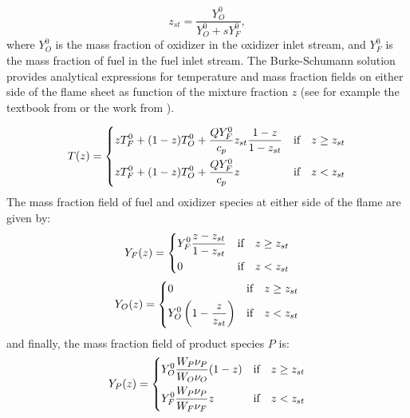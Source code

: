 \begin{equation}
z_{st} = \frac{Y_O^0}{Y_O^0+sY_F^0},
\end{equation}
where $Y_O^0$ is the mass fraction of oxidizer in the oxidizer inlet stream, and $Y_F^0$ is the mass fraction of fuel in the fuel inlet stream. 
The Burke-Schumann solution provides analytical expressions for temperature and mass fraction fields on either side of the flame sheet as function of the mixture fraction $z$ (see for example the textbook from \cite{poinsotTheoreticalNumericalCombustion2005} or the work from \cite{keyesFlameSheetStarting1987}).





\begin{equation}\label{eq:BS-T}
T(z) =
\begin{dcases}
z T_F^0 + (1-z)T_O^0 + \frac{Q Y_F^0}{c_p}z_{st}\frac{1 - z}{1-z_{st}} & \text{if}\quad z \geq z_{st}\\
z T_F^0 + (1-z)T_O^0 + \frac{Q Y_F^0}{c_p}z & \text{if}\quad z < z_{st}
\end{dcases}
\end{equation}
The mass fraction field of fuel and oxidizer species at either side of the flame are given by:
\begin{equation}\label{eq:BS-YF}
Y_F(z) =
\begin{dcases}
Y_F^0\frac{z - z_{st}}{1-z_{st}} & \text{if}\quad z \geq z_{st}\\
0 & \text{if} \quad z < z_{st}
\end{dcases}
\end{equation}
\begin{equation}\label{eq:BS-YO}
Y_O(z) =
\begin{dcases}
0 & \text{if} \quad z \geq z_{st}\\
Y_O^0 \left( 1- \frac{z}{z_{st}}  \right) & \text{if} \quad z < z_{st}
\end{dcases}
\end{equation}
and finally, the mass fraction field of product species $P$ is:
\begin{equation}\label{eq:BS-YP}
Y_P(z) =
\begin{dcases}
Y_O^0\frac{W_P\nu_P}{W_O\nu_O}(1-z) & \text{if} \quad z \geq z_{st}\\
Y_F^0\frac{W_P\nu_P}{W_F\nu_F}z & \text{if} \quad z < z_{st}
\end{dcases}
\end{equation}

